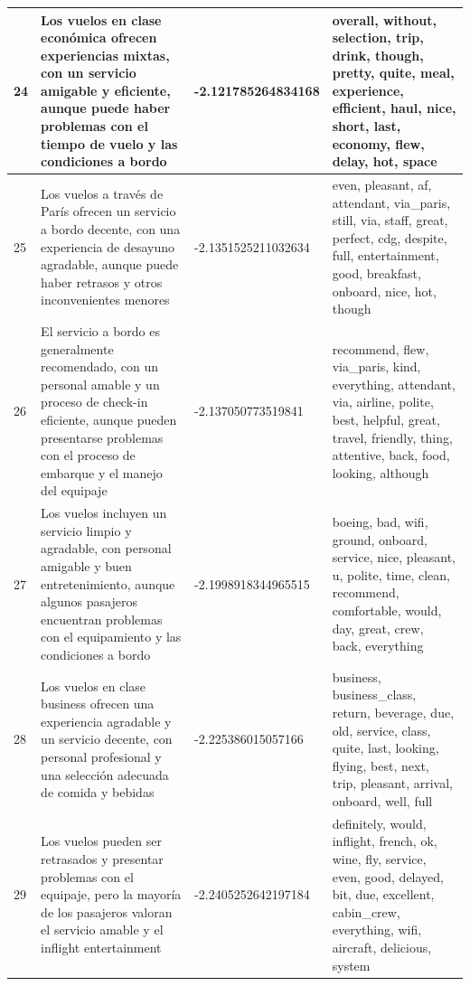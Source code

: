 \documentclass{report}
\begin{document}
\begin{longtable}{|p{1cm}|p{4cm}|p{4cm}|p{6cm}|}
                    \hline
                    24 & Los vuelos en clase económica ofrecen experiencias mixtas, con un servicio amigable y eficiente, aunque puede haber problemas con el tiempo de vuelo y las condiciones a bordo & -2.121785264834168 & overall, without, selection, trip, drink, though, pretty, quite, meal, experience, efficient, haul, nice, short, last, economy, flew, delay, hot, space \\
                    \hline
                    25 & Los vuelos a través de París ofrecen un servicio a bordo decente, con una experiencia de desayuno agradable, aunque puede haber retrasos y otros inconvenientes menores & -2.1351525211032634 & even, pleasant, af, attendant, via\_paris, still, via, staff, great, perfect, cdg, despite, full, entertainment, good, breakfast, onboard, nice, hot, though \\
                    \hline
                    26 & El servicio a bordo es generalmente recomendado, con un personal amable y un proceso de check-in eficiente, aunque pueden presentarse problemas con el proceso de embarque y el manejo del equipaje & -2.137050773519841 & recommend, flew, via\_paris, kind, everything, attendant, via, airline, polite, best, helpful, great, travel, friendly, thing, attentive, back, food, looking, although \\
                    \hline
                    27 & Los vuelos incluyen un servicio limpio y agradable, con personal amigable y buen entretenimiento, aunque algunos pasajeros encuentran problemas con el equipamiento y las condiciones a bordo & -2.1998918344965515 & boeing, bad, wifi, ground, onboard, service, nice, pleasant, u, polite, time, clean, recommend, comfortable, would, day, great, crew, back, everything \\
                    \hline
                    28 & Los vuelos en clase business ofrecen una experiencia agradable y un servicio decente, con personal profesional y una selección adecuada de comida y bebidas & -2.225386015057166 & business, business\_class, return, beverage, due, old, service, class, quite, last, looking, flying, best, next, trip, pleasant, arrival, onboard, well, full \\
                    \hline
                    29 & Los vuelos pueden ser retrasados y presentar problemas con el equipaje, pero la mayoría de los pasajeros valoran el servicio amable y el inflight entertainment & -2.2405252642197184 & definitely, would, inflight, french, ok, wine, fly, service, even, good, delayed, bit, due, excellent, cabin\_crew, everything, wifi, aircraft, delicious, system \\

\end{longtable}
\end{document}
